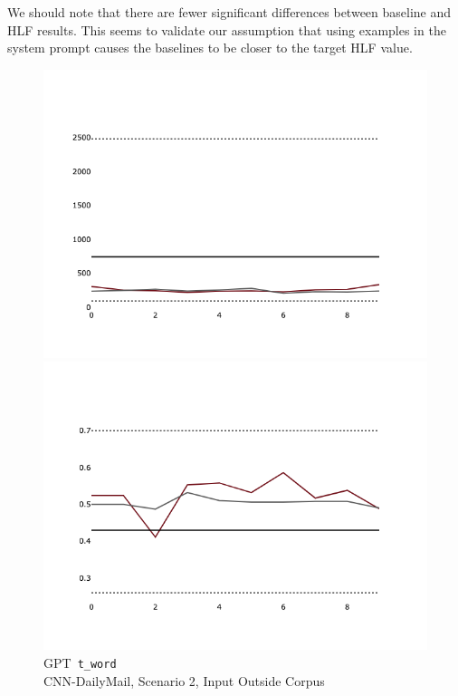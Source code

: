 \documentclass[a4paper,twoside]{article}
\begin{document}
We should note that there are fewer significant differences between baseline and
HLF results.
This seems to validate our assumption that using examples in the system prompt
causes the baselines to be closer to the target HLF value.

\begin{figure}[ht!]
    \centering
    \begin{minipage}{0.32\textwidth}
        \includegraphics[width=\linewidth]{plots/prompt_2/prompt_2-gpt-cnn_dailymail/prompt_2-gpt-cnn_dailymail_t_word.png}
        \caption{GPT~\texttt{t\_word}\\CNN-DailyMail, Scenario 2, Input Outside Corpus}\label{fig-p2-gpt-twords}
    \end{minipage}
    \hfill
    \begin{minipage}{0.32\textwidth}
        \includegraphics[width=\linewidth]{plots/prompt_2/prompt_2-command_r-cnn_dailymail/prompt_2-command_r-cnn_dailymail_simp_ttr.png}

\end{minipage}
\end{figure}
\end{document}
